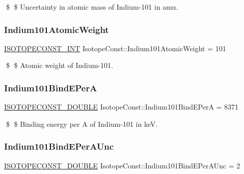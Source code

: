 \$ \$ Uncertainty in atomic mass of Indium-\/101 in amu. \mbox{\label{group___isotope_const-_indium-_in101_gadc08604b069204f3acecb1eecd0cbcc9}} 
\subsubsection{\texorpdfstring{Indium101\+Atomic\+Weight}{Indium101AtomicWeight}}
{\footnotesize\ttfamily \mbox{\hyperlink{group___isotope_const-_macros_ga5f18360b3e99483a35c32d789e62621c}{I\+S\+O\+T\+O\+P\+E\+C\+O\+N\+S\+T\+\_\+\+I\+NT}} Isotope\+Const\+::\+Indium101\+Atomic\+Weight = 101}

\$ \$ Atomic weight of Indium-\/101. \mbox{\label{group___isotope_const-_indium-_in101_ga37097b1359e5c8ab79dc021766be3737}} 
\subsubsection{\texorpdfstring{Indium101\+Bind\+E\+PerA}{Indium101BindEPerA}}
{\footnotesize\ttfamily \mbox{\hyperlink{group___isotope_const-_macros_ga8f45a7272ce02c0b4c65c44636ed719a}{I\+S\+O\+T\+O\+P\+E\+C\+O\+N\+S\+T\+\_\+\+D\+O\+U\+B\+LE}} Isotope\+Const\+::\+Indium101\+Bind\+E\+PerA = 8371}

\$ \$ Binding energy per A of Indium-\/101 in keV. \mbox{\label{group___isotope_const-_indium-_in101_gad27cf1df8fbf93ea7650683adbd4a0b9}} 
\subsubsection{\texorpdfstring{Indium101\+Bind\+E\+Per\+A\+Unc}{Indium101BindEPerAUnc}}
{\footnotesize\ttfamily \mbox{\hyperlink{group___isotope_const-_macros_ga8f45a7272ce02c0b4c65c44636ed719a}{I\+S\+O\+T\+O\+P\+E\+C\+O\+N\+S\+T\+\_\+\+D\+O\+U\+B\+LE}} Isotope\+Const\+::\+Indium101\+Bind\+E\+Per\+A\+Unc = 2}

